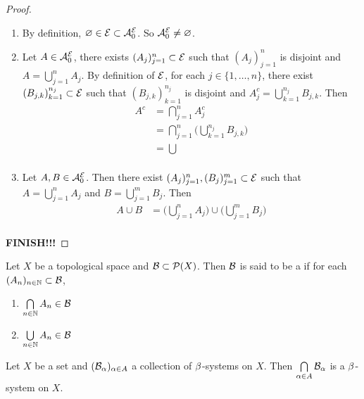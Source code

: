 \documentclass{book}
\begin{document}
	\begin{proof}\
		\begin{enumerate}
			\item By definition, $\varnothing \in \mathcal{E} \subset \mathcal{A}^{\mathcal{E}}_0$. So $\mathcal{A}^{\mathcal{E}}_0 \neq \varnothing$. 
			\item Let $A \in \mathcal{A}^{\mathcal{E}}_0$, there exists $(A_j)_{j=1}^n \subset \mathcal{E}$ such that $(A_j)_{j=1}^n$ is disjoint and $A = \bigcup\limits_{j =1}^n A_j$. By definition of $\mathcal{E}$, for each $j \in \{1, \ldots, n\}$, there exist $(B_{j,k})_{k=1}^{n_j} \subset \mathcal{E}$ such that $(B_{j,k})_{k=1}^{n_j}$ is disjoint and $A_j^c = \bigcup\limits_{k=1}^{n_j}B_{j,k}$. Then 
			\begin{align*}
				A^c 
				&= \bigcap_{j=1}^n A_j^c \\
				&= \bigcap_{j=1}^n \bigg( \bigcup\limits_{k=1}^{n_j}B_{j,k} \bigg)\\
				&= \bigcup\\
			\end{align*}	 
			\item Let $A, B \in \mathcal{A}^{\mathcal{E}}_0$. Then there exist $(A_j)_{j=1}^n, (B_j)_{j=1}^m \subset \mathcal{E}$ such that $A = \bigcup\limits_{j=1}^n A_j$ and  $B = \bigcup\limits_{j=1}^m B_j$. Then 
			\begin{align*}
				A \cup B 
				&=  \bigg( \bigcup\limits_{j=1}^n A_j \bigg) \cup \bigg( \bigcup\limits_{j=1}^m B_j \bigg) \\
			\end{align*}
		\end{enumerate}
		\textbf{FINISH!!!}
	\end{proof}

	
	
	
	
	
	
	
	
	
	
	\begin{defn}  
		Let $X$ be a topological space and $\mathcal{B} \subset \mathcal{P}(X)$. Then $\mathcal{B}$ is said to be a  if for each $(A_n)_{n \in \mathbb{N}} \subset \mathcal{B}$,
		\begin{enumerate}
			\item $\bigcap\limits_{n \in \mathbb{N}} A_n \in \mathcal{B}$
			\item $\bigcup\limits_{n \in \mathbb{N}} A_n \in \mathcal{B}$
		\end{enumerate}
	\end{defn}
	
	\begin{ex}  
		Let $X$ be a set and $(\mathcal{B}_\alpha)_{\alpha \in A}$ a collection of $\beta$-systems on $X$. Then $\bigcap\limits_{\alpha \in A}\mathcal{B}_{\alpha}$ is a $\beta$-system on $X$.
	\end{ex}
	
\end{document}
